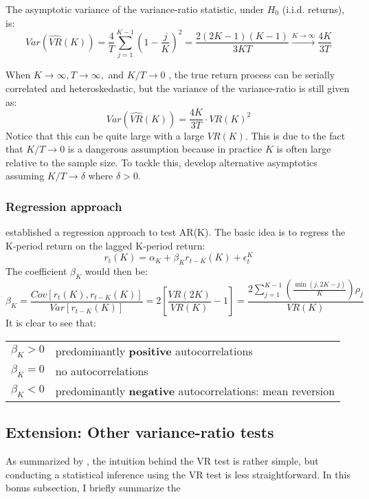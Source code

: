 The asymptotic variance of the variance-ratio statistic, under $H_0$ (i.i.d. returns), is:
\begin{equation}
    Var(\hat{VR}(K))=\frac{4}{T}\sum^{K-1}_{j=1}\left(1-\frac{j}{K}\right)^2=\frac{2(2K-1)(K-1)}{3KT} \xrightarrow{K\rightarrow \infty} \frac{4K}{3T}
\end{equation}

When $K\rightarrow\infty,T\rightarrow\infty,$ and $K/T\rightarrow 0$ \citep[p.~463]{priestley1981spectral}, 
the true return process can be serially correlated and heteroskedastic, but the variance of the variance-ratio
is still given as:
\begin{equation}
    Var(\hat{VR}(K)) = \frac{4K}{3T}\cdot VR(K)^2
\end{equation}
Notice that this can be quite large with a large $VR(K)$. This is due to the fact that $K/T\rightarrow0$ is a dangerous 
assumption because in practice $K$ is often large relative to the sample size. To tackle this, \citet{lo1988stock} develop
alternative asymptotics assuming $K/T\rightarrow \delta$ where $\delta>0$.

\subsubsection{Regression approach}
\citet{fama1988permanent} established a regression approach to test AR(K). The basic idea is to regress the
K-period return on the lagged K-period return:
$$
    r_t(K) = \alpha_K + \beta_K r_{t-K}(K)+\epsilon_t^K
$$
The coefficient $\beta_K$ would then be:
\begin{equation}
    \beta_K = \frac{Cov[r_t(K),r_{t-K}(K)]}{Var[r_{t-K}(K)]} = 2\left[\frac{VR(2K)}{VR(K)}-1\right]=\frac{2\sum^{K-1}_{j=1}\left(\frac{\min (j,2K-j)}{K}\right)\rho_j}{VR(K)}
\end{equation}
It is clear to see that:
\begin{center}
    \begin{tabular}{rl}
    \hline
    $\beta_K > 0$ & predominantly \textbf{positive} autocorrelations  \\ 
    $\beta_K = 0$ & no autocorrelations \\ 
    $\beta_K < 0$ & predominantly \textbf{negative} autocorrelations: mean reversion \\
    \hline
    \end{tabular}
\end{center}

\subsection{Extension: Other variance-ratio tests}
As summarized by \citet{charles2009variance}, the intuition behind the VR test is rather simple, but conducting a statistical inference using the VR test is less
straightforward. In this bonus subsection, I briefly summarize the 

